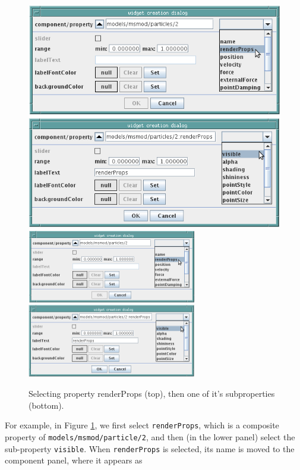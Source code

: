 \documentclass{article}
\begin{document}
\begin{figure}
\begin{center}
\iflatexml
\includegraphics[]{images/selectingRenderVisible}
\else
\includegraphics[width=0.66\textwidth]{images/selectingRenderVisible}
\fi
\end{center}
\caption{Selecting property renderProps (top), then one of it's subproperties (bottom).}%
\label{selectingRenderPropsFig}
\end{figure}

For example, in Figure \ref{selectingRenderPropsFig}, we first select
{\tt renderProps}, which is a composite property of
{\tt models/msmod/particle/2}, and then (in the lower panel) select the
sub-property {\tt visible}.  When {\tt renderProps} is selected, its name is
moved to the component panel, where it appears as
\end{document}
